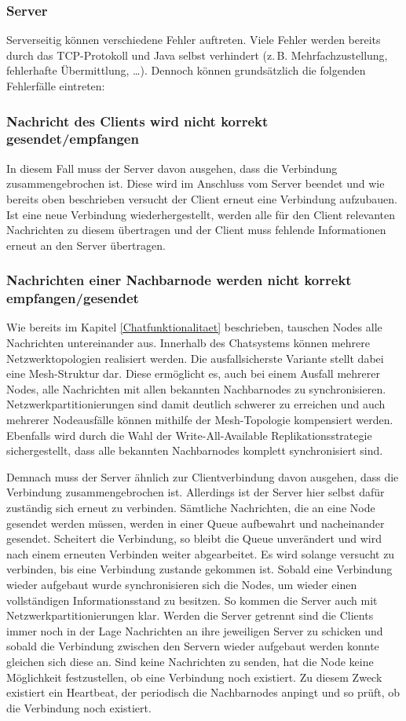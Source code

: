 \subsubsection{Server}
Serverseitig können verschiedene Fehler auftreten. Viele Fehler werden bereits durch das TCP-Protokoll und Java selbst verhindert 
(z.\,B. Mehrfachzustellung, fehlerhafte Übermittlung, \dots). Dennoch können grundsätzlich die folgenden Fehlerfälle eintreten:

\subsubsection*{Nachricht des Clients wird nicht korrekt gesendet/empfangen}
In diesem Fall muss der Server davon ausgehen, dass die Verbindung zusammengebrochen ist. Diese wird im Anschluss vom Server beendet
und wie bereits oben beschrieben versucht der Client erneut eine Verbindung aufzubauen.
Ist eine neue Verbindung wiederhergestellt, werden alle für den Client relevanten Nachrichten zu diesem übertragen 
und der Client muss fehlende Informationen erneut an den Server übertragen.

\subsubsection*{Nachrichten einer Nachbarnode werden nicht korrekt empfangen/gesendet}
Wie bereits im Kapitel \ref{Chatfunktionalitaet} beschrieben, tauschen Nodes alle Nachrichten untereinander aus. Innerhalb des Chatsystems können mehrere
Netzwerktopologien realisiert werden. Die ausfallsicherste Variante stellt dabei eine Mesh-Struktur dar. 
Diese ermöglicht es, auch bei einem Ausfall mehrerer Nodes, alle Nachrichten mit allen bekannten Nachbarnodes zu synchronisieren. Netzwerkpartitionierungen sind damit
deutlich schwerer zu erreichen und auch mehrerer Nodeausfälle können mithilfe der Mesh-Topologie kompensiert werden. Ebenfalls wird durch die Wahl der
Write-All-Available Replikationsstrategie sichergestellt, dass alle bekannten Nachbarnodes komplett synchronisiert sind.


Demnach muss der Server ähnlich zur Clientverbindung davon ausgehen, 
dass die Verbindung zusammengebrochen ist.
Allerdings ist der Server hier selbst dafür zuständig sich erneut zu verbinden. Sämtliche Nachrichten, 
die an eine Node gesendet werden müssen, werden in einer Queue aufbewahrt und nacheinander gesendet.
Scheitert die Verbindung, so bleibt die Queue unverändert und wird nach einem erneuten Verbinden weiter abgearbeitet.
Es wird solange versucht zu verbinden, bis eine Verbindung zustande gekommen ist. 
Sobald eine Verbindung wieder aufgebaut wurde synchronisieren sich die Nodes, um wieder einen vollständigen Informationsstand zu besitzen.
So kommen die Server auch mit Netzwerkpartitionierungen klar. Werden die Server getrennt sind die Clients immer 
noch in der Lage Nachrichten an ihre jeweiligen Server zu schicken und sobald die Verbindung zwischen den Servern wieder aufgebaut werden 
konnte gleichen sich diese an.
Sind keine Nachrichten zu senden, hat die Node keine Möglichkeit festzustellen, ob eine Verbindung noch existiert. 
Zu diesem Zweck existiert ein Heartbeat, der periodisch die Nachbarnodes anpingt und so prüft, ob die Verbindung noch existiert.

